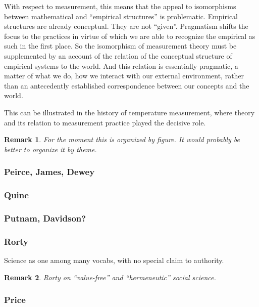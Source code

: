 \documentclass[11pt,twoside]{article}
\newtheorem{remark}{Remark}
\begin{document}
With respect to measurement, this means that the appeal to
isomorphisms between mathematical and ``empirical structures'' is
problematic.  Empirical structures are already conceptual.  They are
not ``given''.  Pragmatism shifts the focus to the practices in virtue
of which we are able to recognize the empirical as such in the first
place.  So the isomorphism of measurement theory must be supplemented
by an account of the relation of the conceptual structure of empirical
systems to the world.  And this relation is essentially pragmatic, a
matter of what we do, how we interact with our external environment,
rather than an antecedently established correspondence between our
concepts and the world.

This can be illustrated in the history of temperature measurement,
where theory and its relation to measurement practice played the
decisive role.

\begin{remark}
  For the moment this is organized by figure.  It would probably be
  better to organize it by theme.
\end{remark}

\subsubsection{Peirce, James, Dewey}

\subsubsection{Quine}

\subsubsection{Putnam, Davidson?}

\subsubsection{Rorty}

Science as one among many vocabs, with no special claim to authority.

\begin{remark}
  Rorty on ``value-free'' and ``hermeneutic'' social science. \cite{rorty_method_1981}
\end{remark}

\subsubsection{Price}
\end{document}

